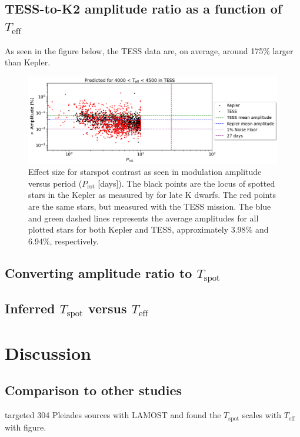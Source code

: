 \documentclass[twocolumn]{aastex631}
\begin{document}
\subsection{TESS-to-K2 amplitude ratio as a function of $T_{\mathrm{eff}}$}

As seen in the figure below, the TESS data are, on average, around 175\% larger than Kepler.

\begin{figure}[!htb]
  \centering
  \includegraphics[width=0.95\columnwidth]{Amplitude vs. Rotation for Kepler and TESS.png}
  \caption{Effect size for starspot contrast as seen in modulation amplitude versus period ($P_{\mathrm{rot}}$ [days]). The black points are the locus of spotted stars in the Kepler as measured by for late K dwarfs. The red points are the same stars, but measured with the TESS mission. The blue and green dashed lines represents the average amplitudes for all plotted stars for both Kepler and TESS, approximately 3.98\% and 6.94\%, respectively.}
\end{figure}
\FloatBarrier

\subsection{Converting amplitude ratio to $T_{\mathrm{spot}}$}

\subsection{Inferred $T_{\mathrm{spot}}$ versus $T_{\mathrm{eff}}$}


\section{Discussion}

\subsection{Comparison to other studies}
\citet{2016MNRAS.463.2494F} targeted 304 Pleiades sources with LAMOST and found the $T_{\mathrm{spot}}$ scales with $T_{\mathrm{eff}}$ with figure.
\end{document}
